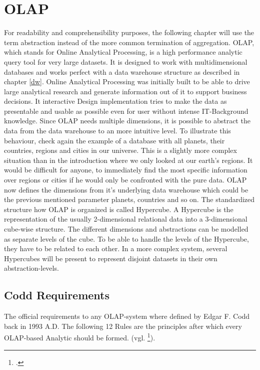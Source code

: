 \documentclass[12pt,a4paper,oneside, 
liststotoc, 					%
bibtotoc,						%
titlepage, 						%
headsepline, 					%
BCOR6mm,						%
openany,							%
]{scrreprt}
\begin{document}
\section{OLAP}\label{olap}
For readability and comprehensibility purposes, the following chapter will use the term abstraction instead of the more common termination of aggregation.
OLAP, which stands for Online Analytical Processing, is a high performance analytic query tool for very large datasets. It is designed to work with multidimensional databases and works perfect with a data warehouse structure as described in chapter \ref{dw}. Online Analytical Processing was initially built to be able to drive large analytical research and generate information out of it to support business decisions. It interactive Design implementation tries to make the data as presentable and usable as possible even for user without intense IT-Background knowledge. Since OLAP needs multiple dimensions, it is possible to abstract the data from the data warehouse to an more intuitive level. To illustrate this behaviour, check again the example of a database with all planets, their countries, regions and cities in our universe. This is a slightly more complex situation than in the introduction where we only looked at our earth's regions. It would be difficult for anyone, to immediately find the most specific information over regions or cities if he would only be confronted with the pure data. OLAP now defines the dimensions from it's underlying data warehouse which could be the previous mentioned parameter planets, countries and so on. The standardized structure how OLAP is organized is called Hypercube. A Hypercube is the representation of the usually 2-dimensional relational data into a 3-dimensional cube-wise structure. The different dimensions and abstractions can be modelled as separate levels of the cube. To be able to handle the levels of the Hypercube, they have to be related to each other. In a more complex system, several Hypercubes will be present to represent disjoint datasets in their own abstraction-levels.
\subsection{Codd Requirements}\label{codd}
The official requirements to any OLAP-system where defined by Edgar F. Codd back in 1993 A.D. The following 12 Rules are the principles after which every OLAP-based Analytic should be formed. (vgl. \footcite{coddrules}).
\end{document}
